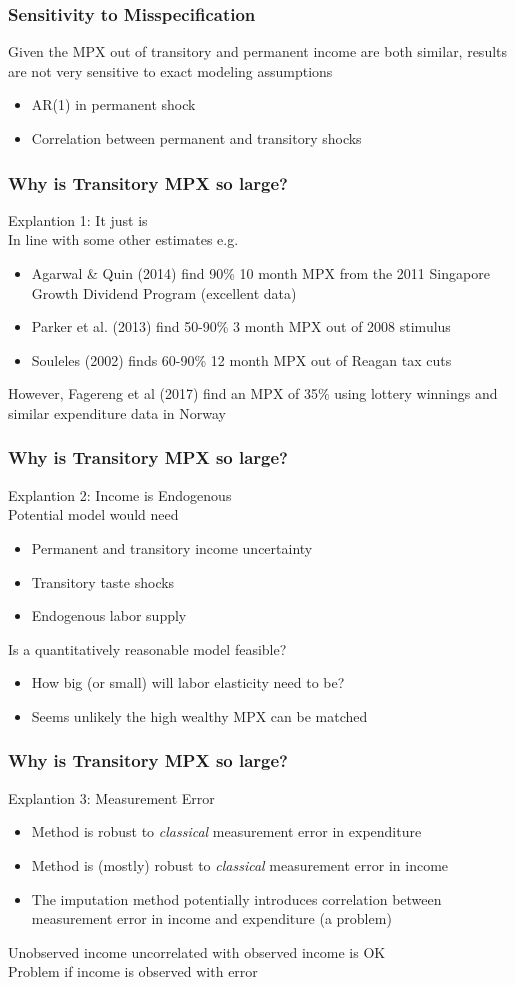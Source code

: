 \documentclass{beamer}
\begin{document}
{
	\frametitle{Sensitivity to Misspecification}
	Given the MPX out of transitory and permanent income are both similar, results are not very sensitive to exact modeling assumptions
	\begin{itemize}
		\item AR(1) in permanent shock
		\item Correlation between permanent and transitory shocks
	\end{itemize}
}
\frame
{
	\frametitle{Why is Transitory MPX so large?}
	Explantion 1: It just is \\
	\bigskip
	In line with some other estimates e.g.
	\begin{itemize}
		\item Agarwal \& Quin (2014) find 90\% 10 month MPX from the 2011 Singapore Growth Dividend Program (excellent data)
		\item Parker et al. (2013) find 50-90\% 3 month MPX out of 2008 stimulus
		\item Souleles (2002) finds 60-90\% 12 month MPX out of Reagan tax cuts
	\end{itemize}
	\pause
	However, Fagereng et al (2017) find an MPX of 35\% using lottery winnings and similar expenditure data in Norway

}
\frame
{
	\frametitle{Why is Transitory MPX so large?}
	Explantion 2: Income is Endogenous\\
	\bigskip
	Potential model would need
	\begin{itemize}
		\item Permanent and transitory income uncertainty
		\item Transitory taste shocks
		\item Endogenous labor supply
	\end{itemize}
	Is a quantitatively reasonable model feasible?
	\begin{itemize}
	\item How big (or small) will labor elasticity need to be?
	\item Seems unlikely the high wealthy MPX can be matched
\end{itemize}
}
\frame
{
	\frametitle{Why is Transitory MPX so large?}
	Explantion 3: Measurement Error\\
	\bigskip
	\begin{itemize}
		\item Method is robust to \textit{classical} measurement error in expenditure
		\item Method is (mostly) robust to \textit{classical} measurement error in income
		\item The imputation method potentially introduces correlation between measurement error in income and expenditure (a problem)
	\end{itemize}
	Unobserved income uncorrelated with observed income is OK\\
	Problem if income is observed with error
}
\end{document}
